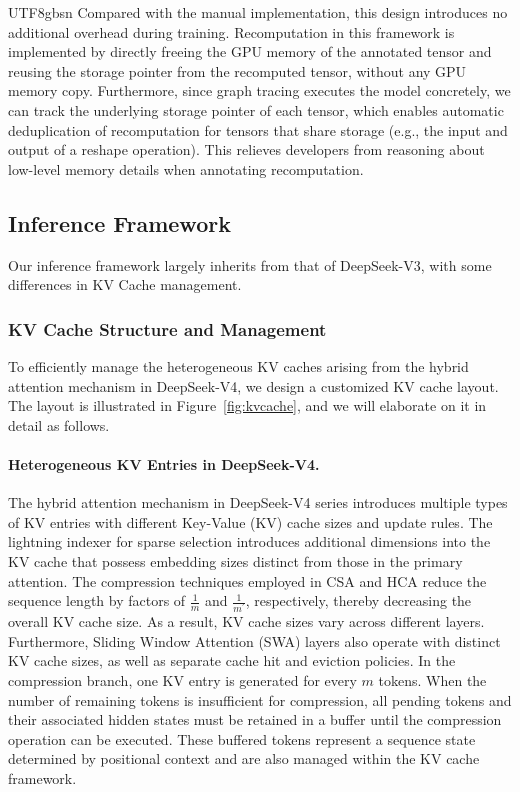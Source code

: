 \documentclass[11pt, a4paper, logo, copyright, nonumbering]{deepseek}
\newcommand{\dsviii}{DeepSeek-V3}
\newcommand{\dsviv}{DeepSeek-V4}
\newcommand{\hca}{HCA}
\newcommand{\csa}{CSA}
\begin{document}
\begin{CJK*}{UTF8}{gbsn}
Compared with the manual implementation, this design introduces no additional overhead during training. 
Recomputation in this framework is implemented by directly freeing the GPU memory of the annotated tensor and reusing the storage pointer from the recomputed tensor, without any GPU memory copy. 
Furthermore, since graph tracing executes the model concretely, we can track the underlying storage pointer of each tensor, which enables automatic deduplication of recomputation for tensors that share storage (e.g., the input and output of a reshape operation). 
This relieves developers from reasoning about low-level memory details when annotating recomputation.

\subsection{Inference Framework}

Our inference framework largely inherits from that of \dsviii{}, with some differences in KV Cache management.

\subsubsection{KV Cache Structure and Management}
To efficiently manage the heterogeneous KV caches arising from the hybrid attention mechanism in \dsviv{}, we design a customized KV cache layout. 
The layout is illustrated in Figure~\ref{fig:kvcache}, and we will elaborate on it in detail as follows.

\paragraph{Heterogeneous KV Entries in \dsviv{}.}
The hybrid attention mechanism in \dsviv{} series introduces multiple types of KV entries with different Key-Value (KV) cache sizes and update rules.
The lightning indexer for sparse selection introduces additional dimensions into the KV cache that possess embedding sizes distinct from those in the primary attention. 
The compression techniques employed in \csa{} and \hca{} reduce the sequence length by factors of $\frac{1}{m}$ and $\frac{1}{m^\prime}$, respectively, thereby decreasing the overall KV cache size.
As a result, KV cache sizes vary across different layers. 
Furthermore, Sliding Window Attention (SWA) layers also operate with distinct KV cache sizes, as well as separate cache hit and eviction policies. 
In the compression branch, one KV entry is generated for every $m$ tokens. 
When the number of remaining tokens is insufficient for compression, all pending tokens and their associated hidden states must be retained in a buffer until the compression operation can be executed. 
These buffered tokens represent a sequence state determined by positional context and are also managed within the KV cache framework.


\end{CJK*}
\end{document}
